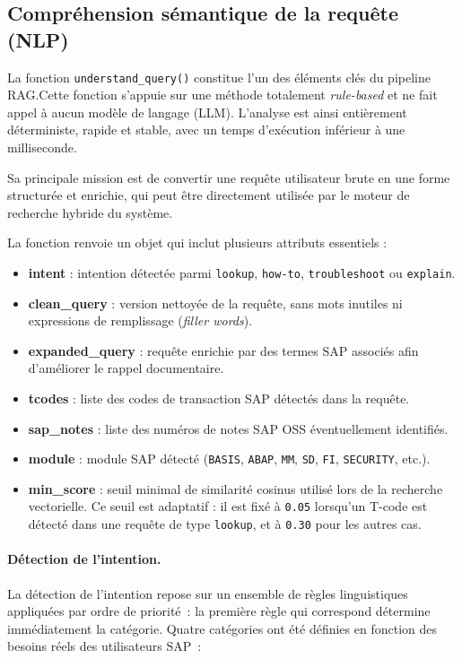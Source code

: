\subsection{Compréhension sémantique de la requête (NLP)}
La fonction \texttt{understand\_query()} constitue l'un des éléments clés du pipeline RAG.Cette fonction s'appuie sur une méthode totalement \textit{rule-based} et ne fait appel à aucun modèle de langage (LLM). L'analyse est ainsi entièrement déterministe, rapide et stable, avec un temps d'exécution inférieur à une milliseconde.

Sa principale mission est de convertir une requête utilisateur brute en une forme structurée et enrichie, qui peut être directement utilisée par le moteur de recherche hybride du système.

La fonction renvoie un objet qui inclut plusieurs attributs essentiels :
\begin{itemize}
    \item \textbf{intent} : intention détectée parmi \texttt{lookup}, \texttt{how-to}, \texttt{troubleshoot} ou \texttt{explain}.
    
    \item \textbf{clean\_query} : version nettoyée de la requête, sans mots inutiles ni expressions de remplissage (\textit{filler words}).
    
    \item \textbf{expanded\_query} : requête enrichie par des termes SAP associés afin d’améliorer le rappel documentaire.
    
    \item \textbf{tcodes} : liste des codes de transaction SAP détectés dans la requête.
    
    \item \textbf{sap\_notes} : liste des numéros de notes SAP OSS éventuellement identifiés.
    
    \item \textbf{module} : module SAP détecté (\texttt{BASIS}, \texttt{ABAP}, \texttt{MM}, \texttt{SD}, \texttt{FI}, \texttt{SECURITY}, etc.).
    
    \item \textbf{min\_score} : seuil minimal de similarité cosinus utilisé lors de la recherche vectorielle. Ce seuil est adaptatif : il est fixé à \texttt{0.05} lorsqu’un T-code est détecté dans une requête de type \texttt{lookup}, et à \texttt{0.30} pour les autres cas.
\end{itemize}

\paragraph{Détection de l’intention.}
La détection de l’intention repose sur un ensemble de règles linguistiques appliquées par ordre de priorité~: la première règle qui correspond détermine immédiatement la catégorie. Quatre catégories ont été définies en fonction des besoins réels des utilisateurs SAP~:

